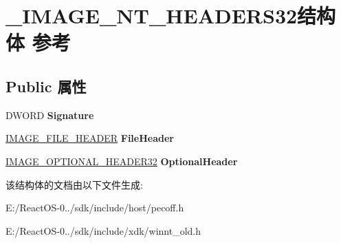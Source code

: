 \hypertarget{struct___i_m_a_g_e___n_t___h_e_a_d_e_r_s32}{}\section{\+\_\+\+I\+M\+A\+G\+E\+\_\+\+N\+T\+\_\+\+H\+E\+A\+D\+E\+R\+S32结构体 参考}
\label{struct___i_m_a_g_e___n_t___h_e_a_d_e_r_s32}
\subsection*{Public 属性}
\begin{DoxyCompactItemize}
\item 
\mbox{\label{struct___i_m_a_g_e___n_t___h_e_a_d_e_r_s32_a90d5f370d970714a7b7dace3b959341b}} 
D\+W\+O\+RD {\bfseries Signature}
\item 
\mbox{\label{struct___i_m_a_g_e___n_t___h_e_a_d_e_r_s32_add373f6bdad1270405fb048a0585645c}} 
\hyperlink{struct___i_m_a_g_e___f_i_l_e___h_e_a_d_e_r}{I\+M\+A\+G\+E\+\_\+\+F\+I\+L\+E\+\_\+\+H\+E\+A\+D\+ER} {\bfseries File\+Header}
\item 
\mbox{\label{struct___i_m_a_g_e___n_t___h_e_a_d_e_r_s32_a388c6666343d992f0075f515921f74f0}} 
\hyperlink{struct___i_m_a_g_e___o_p_t_i_o_n_a_l___h_e_a_d_e_r}{I\+M\+A\+G\+E\+\_\+\+O\+P\+T\+I\+O\+N\+A\+L\+\_\+\+H\+E\+A\+D\+E\+R32} {\bfseries Optional\+Header}
\end{DoxyCompactItemize}


该结构体的文档由以下文件生成\+:\begin{DoxyCompactItemize}
\item 
E\+:/\+React\+O\+S-\/0../sdk/include/host/pecoff.\+h\item 
E\+:/\+React\+O\+S-\/0../sdk/include/xdk/winnt\+\_\+old.\+h\end{DoxyCompactItemize}
